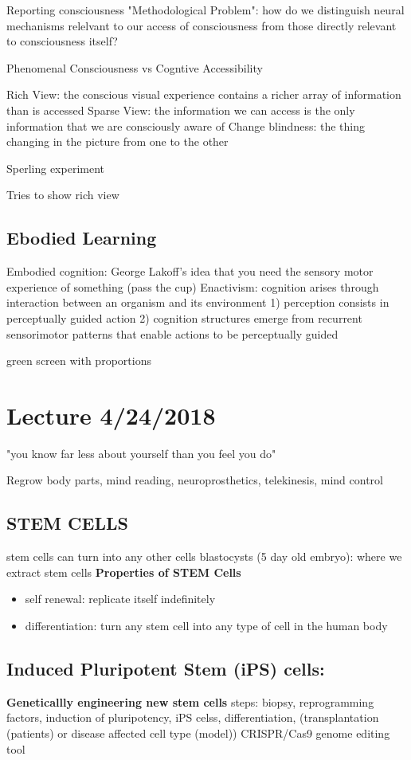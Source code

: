 \documentclass{article}
\begin{document}
Reporting consciousness
"Methodological Problem": how do we distinguish neural mechanisms relelvant to our access of consciousness from those directly relevant to consciousness itself?

Phenomenal Consciousness vs Cogntive Accessibility

Rich View: the conscious visual experience contains a richer array of information than is accessed
Sparse View: the information we can access is the only information that we are consciously aware of
Change blindness: the thing changing in the picture from one to the other

Sperling experiment 

Tries to show rich view

\subsection{Ebodied Learning}
Embodied cognition: George Lakoff's idea that you need the sensory motor experience of something (pass the cup) 
Enactivism: cognition arises through interaction between an organism and its environment
1) perception consists in perceptually guided action
2) cognition structures emerge from recurrent sensorimotor patterns that enable actions to be perceptually guided

green screen with proportions


\section{Lecture 4/24/2018}
"you know far less about yourself than you feel you do"

Regrow body parts, mind reading, neuroprosthetics, telekinesis, mind control 

\subsection{STEM CELLS}
stem cells can turn into any other cells
blastocysts (5 day old embryo): where we extract stem cells
\textbf{Properties of STEM Cells}
\begin{itemize}
    \item self renewal: replicate itself indefinitely
    \item differentiation: turn any stem cell into any type of cell in the human body
\end{itemize}

\subsection{Induced Pluripotent Stem (iPS) cells:}
\textbf{Geneticallly engineering new stem cells } 
steps: biopsy, reprogramming factors, induction of pluripotency, iPS celss, differentiation, (transplantation (patients) or disease affected cell type (model))
CRISPR/Cas9 genome editing tool
\end{document}
